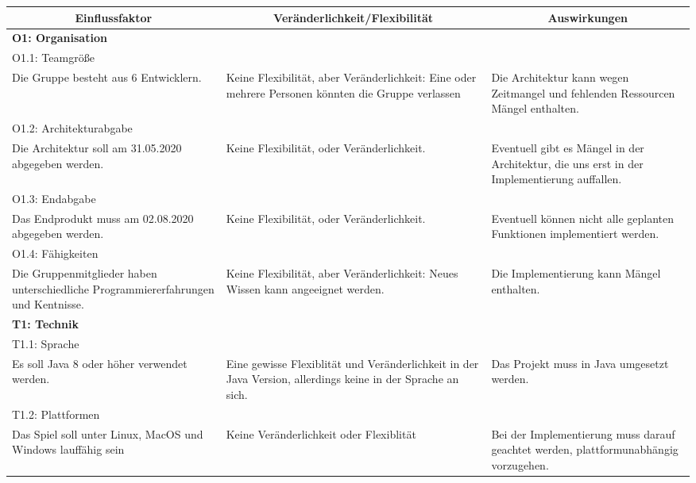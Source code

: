 \documentclass[fontsize=12pt,paper=a4,twoside]{scrartcl}
\begin{document}
\begin{longtable}[c]{|p{5cm}|p{5cm}|p{5cm}|}
\hline
\multicolumn{1}{|c|}{\textbf{Einflussfaktor}} & \multicolumn{1}{c|}{\textbf{Veränderlichkeit/Flexibilität}} & \multicolumn{1}{c|}{\textbf{Auswirkungen}}  \\ \hline
\endhead
\multicolumn{3}{|l|}{{\textbf{O1: Organisation}}} 
\\ \hline
\multicolumn{3}{|l|}{{O1.1: Teamgröße}} 
\\ \hline
Die Gruppe besteht aus 6 Entwicklern. & Keine Flexibilität, aber Veränderlichkeit: Eine oder mehrere Personen könnten die Gruppe verlassen      &  Die Architektur kann wegen Zeitmangel und fehlenden Ressourcen Mängel enthalten.
\\ \hline 
\multicolumn{3}{|l|}{{O1.2: Architekturabgabe}} 
\\ \hline
Die Architektur soll am 31.05.2020 abgegeben werden. & Keine Flexibilität, oder Veränderlichkeit.  & Eventuell gibt es Mängel in der Architektur, die uns erst in der Implementierung auffallen. 
\\ \hline             
\multicolumn{3}{|l|}{{O1.3: Endabgabe}} 
\\ \hline
Das Endprodukt muss am 02.08.2020 abgegeben werden. & Keine Flexibilität, oder Veränderlichkeit.   &  Eventuell können nicht alle geplanten Funktionen implementiert werden.
\\ \hline
\multicolumn{3}{|l|}{{O1.4: Fähigkeiten}} 
\\ \hline
Die Gruppenmitglieder haben unterschiedliche Programmiererfahrungen und Kentnisse. & Keine Flexibilität, aber Veränderlichkeit: Neues Wissen kann angeeignet werden.  & Die Implementierung kann Mängel enthalten. 
\\ \hline     
\multicolumn{3}{|l|}{{\textbf{T1: Technik}}} 
\\ \hline 
\multicolumn{3}{|l|}{{T1.1: Sprache}} 
\\ \hline
Es soll Java 8 oder höher verwendet werden. & Eine gewisse Flexiblität und Veränderlichkeit in der Java Version, allerdings keine in der Sprache an sich.  & Das Projekt muss in Java umgesetzt werden. 
\\ \hline                 
\multicolumn{3}{|l|}{{T1.2: Plattformen}} 
\\ \hline
Das Spiel soll unter Linux, MacOS und Windows lauffähig sein & Keine Veränderlichkeit oder Flexiblität  & Bei der Implementierung muss darauf geachtet werden, plattformunabhängig vorzugehen. 
\\ \hline

\end{longtable}
\end{document}
